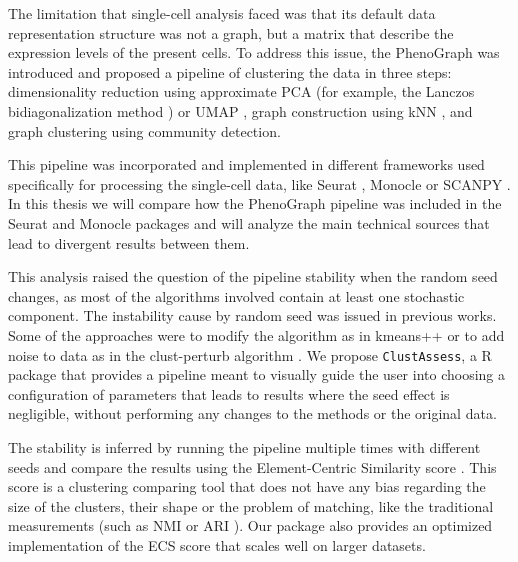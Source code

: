 The limitation that single-cell analysis faced was that its default data representation structure was not a graph, but a matrix that describe the expression levels of the present cells. To address this issue, the PhenoGraph \cite{Levine2015} was introduced and proposed a pipeline of clustering the data in three steps: dimensionality reduction using approximate PCA (for example, the Lanczos bidiagonalization method \cite{Baglama2016IRLBAFP}) or UMAP \cite{mcinnes2018uniform}, graph construction using kNN \cite{Xu2015}, and graph clustering using community detection.

This pipeline was incorporated and implemented in different frameworks used specifically for processing the single-cell data, like Seurat \cite{Hao2021}, Monocle \cite{Cao2019} or SCANPY \cite{Wolf2018}. In this thesis we will compare how the PhenoGraph pipeline was included in the Seurat and Monocle packages and will analyze the main technical sources that lead to divergent results between them.

This analysis raised the question of the pipeline stability when the random seed changes, as most of the algorithms involved contain at least one stochastic component. The instability cause by random seed was issued in previous works. Some of the approaches were to modify the algorithm as in kmeans++ \cite{kmeanspp} or to add noise to data as in the clust-perturb algorithm \cite{STACEY2021}. We propose \verb|ClustAssess|, a R package that provides a pipeline meant to visually guide the user into choosing a configuration of parameters that leads to results where the seed effect is negligible, without performing any changes to the methods or the original data.

The stability is inferred by running the pipeline multiple times with different seeds and compare the results using the Element-Centric Similarity score \cite{Gates2019}. This score is a clustering comparing tool that does not have any bias regarding the size of the clusters, their shape or the problem of matching, like the traditional measurements (such as NMI \cite{McDaid2015} or ARI \cite{Collins1988}). Our package also provides an optimized implementation of the ECS score that scales well on larger datasets.

